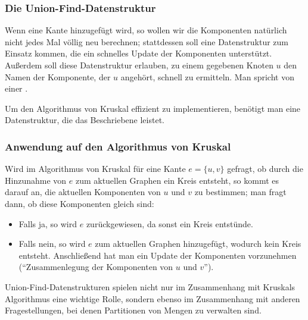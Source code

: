 \documentclass[smaller,xcolor=dvipsnames]{beamer}
\begin{document}
\begin{frame}
\frametitle{Die Union-Find-Datenstruktur}
 Wenn eine Kante hinzugefügt wird, so wollen wir die Komponenten natürlich nicht jedes Mal völlig neu berechnen; stattdessen soll eine Datenstruktur zum Einsatz kommen, die ein schnelles Update der Komponenten unterstützt. Außerdem soll diese Datenstruktur erlauben, zu einem gegebenen Knoten $u$ den Namen der Komponente, der $u$ angehört, schnell zu ermitteln. Man spricht von einer . \\ \medskip

 \alert{Um den Algorithmus von Kruskal effizient zu implementieren, benötigt man eine Datenstruktur, die das Beschriebene leistet.}
\end{frame}

\begin{frame}
\frametitle{Anwendung auf den Algorithmus von Kruskal}
Wird im Algorithmus von Kruskal für eine Kante $e=\{u,v\}$ gefragt, ob durch die Hinzunahme von $e$ zum aktuellen Graphen ein Kreis entsteht, so kommt es darauf an, die aktuellen Komponenten von $u$ und $v$ zu bestimmen; man fragt dann, \alert{ob diese Komponenten gleich sind:}
\begin{itemize}
\item Falls ja, so wird $e$ zurückgewiesen, da sonst ein Kreis entstünde.
\item Falls nein, so wird $e$ zum aktuellen Graphen hinzugefügt, wodurch kein Kreis entsteht. Anschließend hat man ein Update der Komponenten vorzunehmen (\enquote{Zusammenlegung der Komponenten von $u$ und $v$}).
\end{itemize}

Union-Find-Datenstrukturen spielen nicht nur im Zusammenhang mit Kruskals Algorithmus eine wichtige Rolle, sondern ebenso im Zusammenhang mit anderen Fragestellungen, bei denen \alert{Partitionen} von Mengen zu verwalten sind. %
\end{frame}
\end{document}
